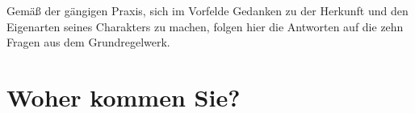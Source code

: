 Gemäß der gängigen Praxis, sich im Vorfelde Gedanken zu der Herkunft und den Eigenarten seines Charakters zu machen, folgen hier die Antworten auf die zehn Fragen aus dem Grundregelwerk.

\section{Woher kommen Sie?}


\section{}


\section{}


\section{}


\section{}


\section{}


\section{}


\section{}


\section{}


\section{}

